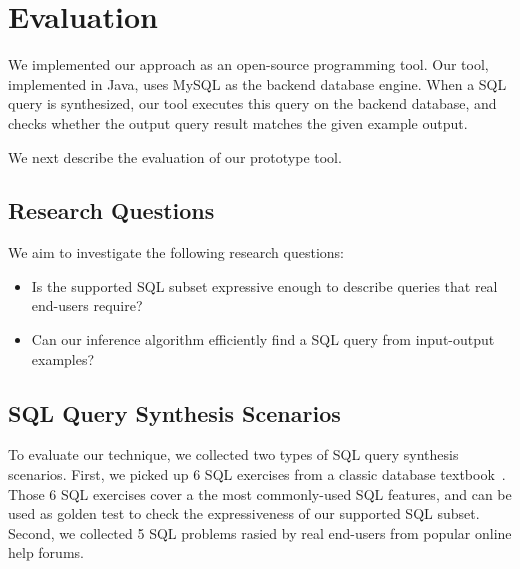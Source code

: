 
\section{Evaluation}
\label{sec:evaluation}

We implemented our approach as an open-source programming tool. Our tool, implemented
in Java, uses MySQL as the backend database engine. When a SQL query is synthesized,
our tool executes this query on the backend database, and checks whether the output
query result matches the given example output.

We next describe the evaluation of our prototype tool.

\subsection{Research Questions}

We aim to investigate the following research questions:

\begin{itemize}
\item Is the supported SQL subset expressive enough to describe
queries that real end-users require?

\item Can our inference algorithm efficiently find a SQL query
from input-output examples?


\end{itemize}


\subsection{SQL Query Synthesis Scenarios}

To evaluate our technique, we collected two types of
SQL query synthesis scenarios. First, we picked
up 6 SQL exercises from a classic database textbook~\cite{cowbook}.
Those 6 SQL exercises cover a the most commonly-used SQL features,
and can be used as golden test to check the expressiveness
of our supported SQL subset. Second, we collected
5 SQL problems rasied by real end-users from popular online help forums.


